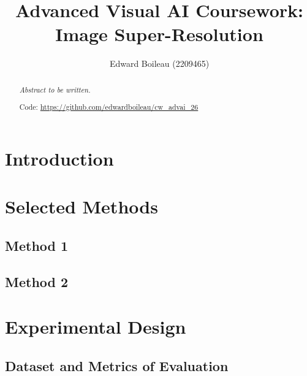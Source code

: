 \documentclass[11pt,a4paper]{article}
\title{Advanced Visual AI Coursework: Image Super-Resolution}
\author{Edward Boileau (2209465)}
\date{}
\begin{document}
\maketitle

\begin{abstract}
\noindent\textit{Abstract to be written.}

\noindent Code: \url{https://github.com/edwardboileau/cw_advai_26}
\end{abstract}

\section{Introduction}

\section{Selected Methods}

\subsection{Method 1}

\subsection{Method 2}


\section{Experimental Design}

\subsection{Dataset and Metrics of Evaluation}
\end{document}
